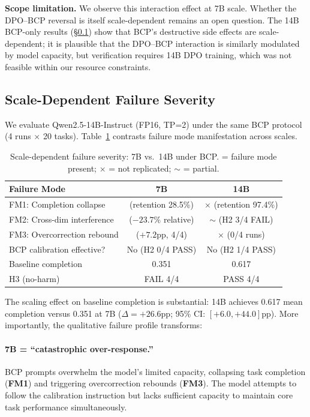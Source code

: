 \documentclass[11pt]{article}
\newcommand{\fm}[1]{\textbf{FM#1}}
\newcommand{\cmark}{\checkmark}
\newcommand{\xmark}{$\times$}
\begin{document}
\textbf{Scope limitation.} We observe this interaction effect at 7B scale. Whether the DPO--BCP reversal is itself scale-dependent remains an open question. The 14B BCP-only results (\S\ref{sec:scale}) show that BCP's destructive side effects are scale-dependent; it is plausible that the DPO--BCP interaction is similarly modulated by model capacity, but verification requires 14B DPO training, which was not feasible within our resource constraints.

\subsection{Scale-Dependent Failure Severity}
\label{sec:scale}

We evaluate Qwen2.5-14B-Instruct (FP16, TP=2) under the same BCP protocol (4 runs $\times$ 20 tasks). Table~\ref{tab:scale} contrasts failure mode manifestation across scales.

\begin{table}[t]
\centering
\small
\caption{Scale-dependent failure severity: 7B vs.\ 14B under BCP. \cmark{} = failure mode present; \xmark{} = not replicated; $\sim$ = partial.}
\label{tab:scale}
\begin{tabular}{p{3.8cm}cc}
\toprule
\textbf{Failure Mode} & \textbf{7B} & \textbf{14B} \\
\midrule
FM1: Completion collapse    & \cmark{} (retention 28.5\%)  & \xmark{} (retention 97.4\%) \\
FM2: Cross-dim interference & \cmark{} ($-23.7\%$ relative) & $\sim$ (H2 3/4 FAIL) \\
FM3: Overcorrection rebound & \cmark{} ($+7.2$pp, 4/4)    & \xmark{} (0/4 runs) \\
\midrule
BCP calibration effective?  & No (H2 0/4 PASS)            & No (H2 1/4 PASS) \\
Baseline completion         & 0.351                        & 0.617 \\
H3 (no-harm)                & FAIL 4/4                     & PASS 4/4 \\
\bottomrule
\end{tabular}
\end{table}

The scaling effect on baseline completion is substantial: 14B achieves 0.617 mean completion versus 0.351 at 7B ($\Delta = +26.6$pp; 95\% CI: $[+6.0, +44.0]$pp). More importantly, the qualitative failure profile transforms:

\paragraph{7B = ``catastrophic over-response.''}
BCP prompts overwhelm the model's limited capacity, collapsing task completion (\fm{1}) and triggering overcorrection rebounds (\fm{3}). The model attempts to follow the calibration instruction but lacks sufficient capacity to maintain core task performance simultaneously.
\end{document}

